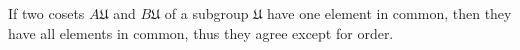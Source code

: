 If two cosets $A\mathfrak{U}$ and $B\mathfrak{U}$ of a subgroup $\mathfrak{U}$ have one element in common, then they have all elements in common, thus they agree except for order.
